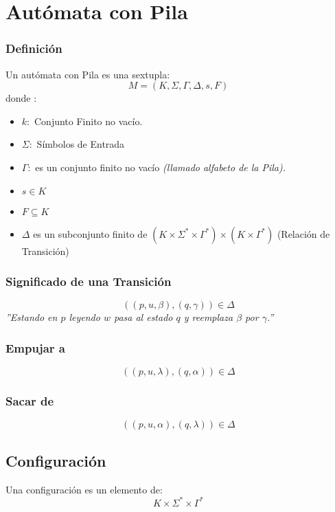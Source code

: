 \section{Autómata con Pila}
\subsubsection{Definición}
Un autómata con Pila es una sextupla:
$$
M = (K,\Sigma,\Gamma,\Delta,s,F)
$$
donde :
\begin{itemize}
\item $k:$ Conjunto Finito no vacío.
\item $\Sigma:$ Símbolos de Entrada
\item $\Gamma:$ es un conjunto finito no vacío \textit{(llamado alfabeto de la Pila).}
\item $s\in K$
\item $F \subseteq K$
\item $\Delta$ es un subconjunto finito de $(K\times\Sigma^*\times\Gamma^* ) \times (K\times\Gamma^*)$ (Relación de Transición)  
\end{itemize}
\subsubsection*{Significado de una Transición}
$$
((p,u,\beta),(q,\gamma)) \in \Delta
$$
\textit{''Estando en $p$ leyendo $w$ pasa al estado $q$ y reemplaza $\beta$ por $\gamma$.''}
\subsubsection*{Empujar a}
$$
((p,u,\lambda),(q,\alpha))\in\Delta
$$
\subsubsection*{Sacar de}
$$
((p,u,\alpha),(q,\lambda))\in\Delta
$$
\subsection{Configuración}
Una configuración es un elemento de:
$$
K\times\Sigma^* \times \Gamma^*
$$
